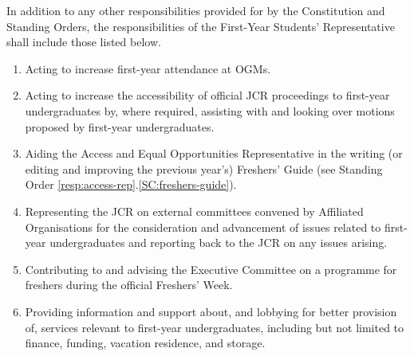 \npara In addition to any other responsibilities provided for by the Constitution and Standing Orders, the responsibilities of the First-Year Students’ Representative shall include those listed below.
\begin{enumerate}
    \item Acting to increase first-year attendance at OGMs. 
    \item Acting to increase the accessibility of official JCR proceedings to first-year undergraduates by, where required, assisting with and looking over motions proposed by first-year undergraduates.
    \item Aiding the Access and Equal Opportunities Representative in the writing (or editing and improving the previous year’s) Freshers’ Guide (see Standing Order \ref{resp:access-rep}.\ref{SC:freshers-guide}).
    \item Representing the JCR on external committees convened by Affiliated Organisations for the consideration and advancement of issues related to first-year undergraduates and reporting back to the JCR on any issues arising.
    \item Contributing to and advising the Executive Committee on a programme for freshers during the official Freshers’ Week. 
    \item Providing information and support about, and lobbying for better provision of, services relevant to first-year undergraduates, including but not limited to finance, funding, vacation residence, and storage. 
\end{enumerate}



